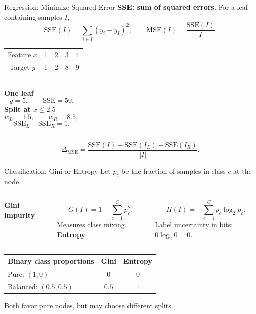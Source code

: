 \begin{frame}{Regression: Minimize Squared Error}
	\setlength{\abovedisplayskip}{5pt}\setlength{\belowdisplayskip}{5pt}
	\setlength{\abovedisplayshortskip}{3pt}\setlength{\belowdisplayshortskip}{5pt}
	\textbf{SSE: sum of squared errors.} For a leaf containing samples $I$,
	\[\mathrm{SSE}(I)=\sum_{i\in I}(y_i-\bar y_I)^2,
	\qquad \mathrm{MSE}(I)=\frac{\mathrm{SSE}(I)}{|I|}.\]
	\centering
	\renewcommand{\arraystretch}{1.1}
	\begin{tabular}{c|rrrr}
		Feature $x$ & 1 & 2 & 3 & 4\\
		Target $y$ & 1 & 2 & 8 & 9
	\end{tabular}
	\vspace{.5cm}
	\begin{columns}[T,onlytextwidth]
		\textbf{One leaf}
		\[\bar y=5,\qquad \mathrm{SSE}=50.\]
		\pause
		\textbf{Split at $x\le2.5$}
		\[w_L=1.5,\qquad w_R=8.5,\]
		\[\mathrm{SSE}_L+\mathrm{SSE}_R=1.\]
	\end{columns}
	\pause
	\vspace{.05cm}
	\[\Delta_{\mathrm{MSE}}=
	\frac{\mathrm{SSE}(I)-\mathrm{SSE}(I_L)-\mathrm{SSE}(I_R)}{|I|}.\]
\end{frame}

\begin{frame}{Classification: Gini or Entropy}
	\setlength{\abovedisplayskip}{5pt}\setlength{\belowdisplayskip}{5pt}
	\setlength{\abovedisplayshortskip}{3pt}\setlength{\belowdisplayshortskip}{5pt}
	Let $p_c$ be the fraction of samples in class $c$ at the node.
	\vspace{.3cm}
	\begin{columns}[T,onlytextwidth]
		{\large\color{slideorange}\textbf{Gini impurity}}\par
		\[G(I)=1-\sum_{c=1}^{C}p_c^2.\]
		Measures class mixing.
		\pause
		{\large\color{slideorange}\textbf{Entropy}}\par
		\[H(I)=-\sum_{c=1}^{C}p_c\log_2 p_c.\]
		Label uncertainty in bits; $0\log_2 0=0$.
	\end{columns}
	\pause
	\vspace{.2cm}
	\centering
	\renewcommand{\arraystretch}{1.15}
	\begin{tabular}{lcc}
		\toprule
		Binary class proportions & Gini & Entropy\\ \midrule
		Pure: $(1,0)$ & $0$ & $0$\\
		Balanced: $(0.5,0.5)$ & $0.5$ & $1$\\ \bottomrule
	\end{tabular}
	\vspace{.2cm}
	\par Both favor pure nodes, but may choose different splits.
\end{frame}

